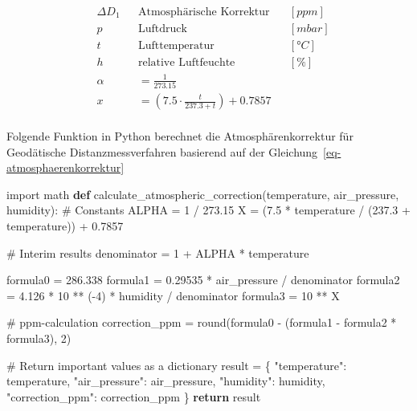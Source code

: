 \documentclass[
  11pt,
  a4paperpaper,
  oneside, openany  ,captions=tableheading
]{scrbook}
\newenvironment{Shaded}{\begin{snugshade}}{\end{snugshade}}
\newcommand{\BuiltInTok}[1]{\textcolor[rgb]{0.00,0.23,0.31}{#1}}
\newcommand{\CommentTok}[1]{\textcolor[rgb]{0.37,0.37,0.37}{#1}}
\newcommand{\ControlFlowTok}[1]{\textcolor[rgb]{0.00,0.23,0.31}{\textbf{#1}}}
\newcommand{\DecValTok}[1]{\textcolor[rgb]{0.68,0.00,0.00}{#1}}
\newcommand{\FloatTok}[1]{\textcolor[rgb]{0.68,0.00,0.00}{#1}}
\newcommand{\ImportTok}[1]{\textcolor[rgb]{0.00,0.46,0.62}{#1}}
\newcommand{\KeywordTok}[1]{\textcolor[rgb]{0.00,0.23,0.31}{\textbf{#1}}}
\newcommand{\NormalTok}[1]{\textcolor[rgb]{0.00,0.23,0.31}{#1}}
\newcommand{\OperatorTok}[1]{\textcolor[rgb]{0.37,0.37,0.37}{#1}}
\newcommand{\StringTok}[1]{\textcolor[rgb]{0.13,0.47,0.30}{#1}}
\theoremstyle{definition}
\theoremstyle{remark}
\begin{document}
\[\begin{aligned}
& \Delta D_1 && \text{Atmosphärische Korrektur} && [ppm]\\
& p && \text{Luftdruck} && [mbar]\\
& t && \text{Lufttemperatur} && [°C]\\
& h && \text{relative Luftfeuchte} && [\%]\\
& \alpha && = \frac{1}{273.15} \\
& x && = (7.5 \cdot \frac{t}{237.3 +t}) + 0.7857 \\
\end{aligned}
\]

Folgende Funktion in Python berechnet die Atmosphärenkorrektur für
Geodätische Distanzmessverfahren basierend auf der
Gleichung~\ref{eq-atmosphaerenkorrektur}

\begin{Shaded}
\begin{Highlighting}[]
\ImportTok{import}\NormalTok{ math}
\KeywordTok{def}\NormalTok{ calculate\_atmospheric\_correction(temperature, air\_pressure, humidity):}
    \CommentTok{\# Constants}
\NormalTok{    ALPHA }\OperatorTok{=} \DecValTok{1} \OperatorTok{/} \FloatTok{273.15}
\NormalTok{    X }\OperatorTok{=}\NormalTok{ (}\FloatTok{7.5} \OperatorTok{*}\NormalTok{ temperature }\OperatorTok{/}\NormalTok{ (}\FloatTok{237.3} \OperatorTok{+}\NormalTok{ temperature)) }\OperatorTok{+} \FloatTok{0.7857}

    \CommentTok{\# Interim results}
\NormalTok{    denominator }\OperatorTok{=} \DecValTok{1} \OperatorTok{+}\NormalTok{ ALPHA }\OperatorTok{*}\NormalTok{ temperature}

\NormalTok{    formula0 }\OperatorTok{=} \FloatTok{286.338}
\NormalTok{    formula1 }\OperatorTok{=} \FloatTok{0.29535} \OperatorTok{*}\NormalTok{ air\_pressure }\OperatorTok{/}\NormalTok{ denominator}
\NormalTok{    formula2 }\OperatorTok{=} \FloatTok{4.126} \OperatorTok{*} \DecValTok{10} \OperatorTok{**}\NormalTok{ (}\OperatorTok{{-}}\DecValTok{4}\NormalTok{) }\OperatorTok{*}\NormalTok{ humidity }\OperatorTok{/}\NormalTok{ denominator}
\NormalTok{    formula3 }\OperatorTok{=} \DecValTok{10} \OperatorTok{**}\NormalTok{ X}

    \CommentTok{\# ppm{-}calculation}
\NormalTok{    correction\_ppm }\OperatorTok{=} \BuiltInTok{round}\NormalTok{(formula0 }\OperatorTok{{-}}\NormalTok{ (formula1 }\OperatorTok{{-}}\NormalTok{ formula2 }\OperatorTok{*}\NormalTok{ formula3), }\DecValTok{2}\NormalTok{)}

    \CommentTok{\# Return important values as a dictionary}
\NormalTok{    result }\OperatorTok{=}\NormalTok{ \{}
        \StringTok{"temperature"}\NormalTok{: temperature,}
        \StringTok{"air\_pressure"}\NormalTok{: air\_pressure,}
        \StringTok{"humidity"}\NormalTok{: humidity,}
        \StringTok{"correction\_ppm"}\NormalTok{: correction\_ppm}
\NormalTok{    \}}
    \ControlFlowTok{return}\NormalTok{ result}
\end{Highlighting}
\end{Shaded}
\end{document}
